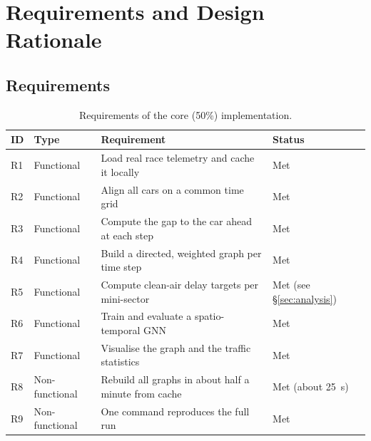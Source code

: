 \documentclass[11pt,a4paper]{article}
\begin{document}
\section{Requirements and Design Rationale}
\label{sec:design}

\subsection{Requirements}
\begin{table}[H]
\centering
\caption{Requirements of the core (50\%) implementation.}
\label{tab:requirements}
\small
\begin{tabularx}{\linewidth}{@{}llXl@{}}
\toprule
\textbf{ID} & \textbf{Type} & \textbf{Requirement} & \textbf{Status} \\
\midrule
R1 & Functional & Load real race telemetry and cache it locally & Met \\
R2 & Functional & Align all cars on a common time grid & Met \\
R3 & Functional & Compute the gap to the car ahead at each step & Met \\
R4 & Functional & Build a directed, weighted graph per time step & Met \\
R5 & Functional & Compute clean-air delay targets per mini-sector & Met (see \S\ref{sec:analysis}) \\
R6 & Functional & Train and evaluate a spatio-temporal GNN & Met \\
R7 & Functional & Visualise the graph and the traffic statistics & Met \\
R8 & Non-functional & Rebuild all graphs in about half a minute from cache & Met (about 25~s) \\
R9 & Non-functional & One command reproduces the full run & Met \\
\bottomrule
\end{tabularx}
\end{table}
\end{document}
